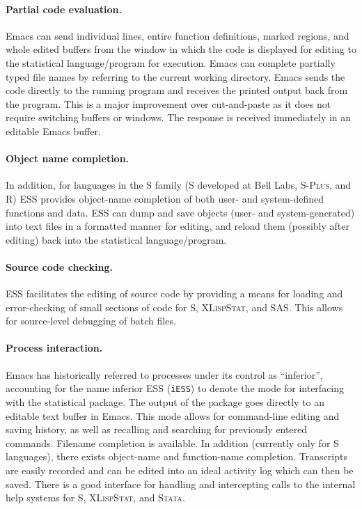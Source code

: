 \documentclass{article}
\newcommand*{\Splus}{\textsc{S-Plus}}
\newcommand*{\XLispStat}{\textsc{XLispStat}}
\newcommand*{\Stata}{\textsc{Stata}}
\newcommand{\stexttt}[1]{{\small\texttt{#1}}}
\begin{document}
\paragraph{Partial code evaluation.}
Emacs can send individual lines, entire function definitions, marked
regions, and whole edited buffers from the window in which the code is
displayed for editing to the statistical language/program for
execution.  Emacs can complete partially typed file names by referring
to the current working directory.  Emacs sends the code directly to
the running program and receives the printed output back from the
program.  This is a major improvement over cut-and-paste as it does
not require switching buffers or windows.  The response is
received immediately in an editable Emacs buffer.

\paragraph{Object name completion.}
In addition, for languages in the S family (S
developed at Bell Labs, \Splus, and R)
ESS provides object-name completion of both user- and system-defined
functions and data.  ESS can dump and save
objects (user- and system-generated) into text files in a formatted
manner for editing, and reload them (possibly after editing) back
into the statistical language/program.

\paragraph{Source code checking.}
ESS facilitates the editing of source code by providing a means for
loading and error-checking of small sections of code for S,
\XLispStat, and SAS.  This allows for source-level debugging of batch
files.

\paragraph{Process interaction.}
Emacs has historically referred to processes under its control as
``inferior'', accounting for the name inferior ESS (\stexttt{iESS}) to
denote the mode for interfacing with the statistical package.  The
output of the package goes directly to an editable text buffer in Emacs.
This mode allows for command-line editing and saving history, as well as
recalling and searching for previously entered commands.  Filename
completion is available.  In addition (currently only for S languages),
there exists object-name and function-name completion.  Transcripts are
easily recorded and can be edited into an ideal activity log which can
then be saved.  There is a good interface for handling and intercepting
calls to the internal help systems for S, \XLispStat, and \Stata.
\end{document}
